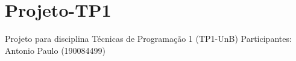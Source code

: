 \chapter{Projeto-\/\+TP1}
\hypertarget{md__c_1_2_users_2_usuario_2_desktop_2_duarte_2_downloads_2_antonio_01_paulo_2_estudos_2_t_p1_2_pec2fe820242e36d5aaaaadc84db87ffd}{}\label{md__c_1_2_users_2_usuario_2_desktop_2_duarte_2_downloads_2_antonio_01_paulo_2_estudos_2_t_p1_2_pec2fe820242e36d5aaaaadc84db87ffd}
\label{md__c_1_2_users_2_usuario_2_desktop_2_duarte_2_downloads_2_antonio_01_paulo_2_estudos_2_t_p1_2_pec2fe820242e36d5aaaaadc84db87ffd_autotoc_md0}%
%
Projeto para disciplina Técnicas de Programação 1 (TP1-\/\+UnB) Participantes\+: Antonio Paulo (190084499) 